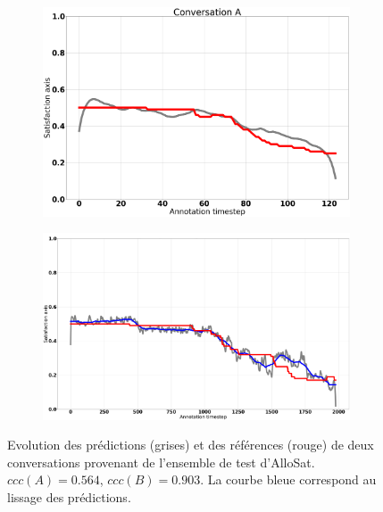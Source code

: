 \begin{figure}[h]
        \centering
        \begin{subfigure}{.49\textwidth}
          \centering
          \includegraphics[width=.99\linewidth]{./Chapitre5/figures/cccVSrmse1.png}
        \end{subfigure}
        \begin{subfigure}{.49\textwidth}
          \centering
          \includegraphics[width=.99\linewidth]{./Chapitre5/figures/lissage2.png}
        \end{subfigure}
        \caption{Evolution des prédictions (grises) et des références (rouge) de deux conversations provenant de l'ensemble de test d'AlloSat. $ccc(A) = 0.564$, $ccc(B) = 0.903$. La courbe bleue correspond au lissage des prédictions.}
        \label{fig:cccVSrmse}
    \end{figure}
